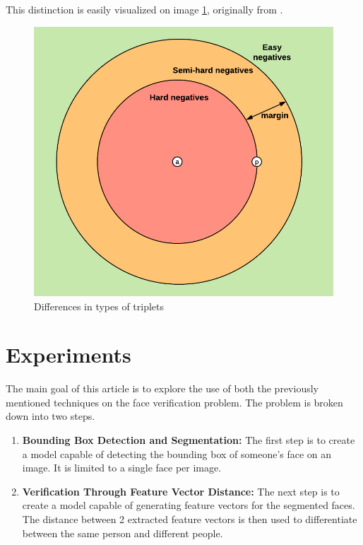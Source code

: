 \documentclass[runningheads]{llncs}
\begin{document}
This distinction is easily visualized on image \ref{triplet_diff_img}, originally from \cite{triplet_diffs}.

\begin{figure}
    \begin{center}
        \includegraphics[scale=0.6]{triplet_diff.png}
        \caption{Differences in types of triplets}
        \label{triplet_diff_img}
    \end{center}
\end{figure}



\section{Experiments}

The main goal of this article is to explore the use of both the previously mentioned techniques on the face verification problem. The problem is broken down into two steps.

\begin{enumerate}
  \item \textbf{Bounding Box Detection and Segmentation:} The first step is to create a model capable of detecting the bounding box of someone's face on an image. It is limited to a single face per image.
  \item \textbf{Verification Through Feature Vector Distance:} The next step is to create a model capable of generating feature vectors for the segmented faces. The distance between 2 extracted feature vectors is then used to differentiate between the same person and different people.
\end{enumerate}
\end{document}
